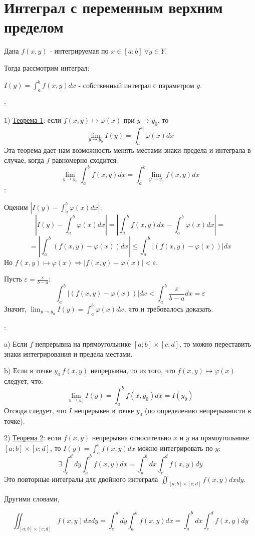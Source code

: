 \documentclass[12pt]{article}
\begin{document}
\section{Интеграл с переменным верхним пределом}
Дана $f(x,y)$ - интегрируемая по $x \in [a;b] \ \forall y \in Y$.\par
Тогда рассмотрим интеграл:\par
$I(y) = \int_a^b f(x,y) dx$ - собственный интеграл с параметром $y$.\par
{}:\par
1) \uline{Теорема 1}: если $f(x,y) \mapsto \varphi(x)$ при $y \to y_0$, то
$$\lim_{y \to y_0} I(y) = \int_a^b \varphi (x) dx$$
Эта теорема дает нам возможность менять местами знаки предела и интеграла в случае, когда $f$ равномерно сходится:
$$\lim_{y \to y_0} \int_a^b f(x,y) dx = \int_a^b \lim_{y \to y_0} f(x,y) dx$$
:\par
Оценим $|I(y)-\int_a^b \varphi(x)dx|$:
$$|I(y)-\int_a^b \varphi(x)dx| = |\int_a^b f(x,y)dx-\int_a^b \varphi(x)dx| =$$
$$= |\int_a^b (f(x,y)-\varphi(x))dx| \leq \int_a^b |(f(x,y)-\varphi(x))|dx$$
Но $f(x,y) \mapsto \varphi(x) \Rightarrow |f(x,y) - \varphi(x)| < \varepsilon$.\par
Пусть $\varepsilon = \frac{\varepsilon}{b-a}$:
$$\int_a^b |(f(x,y)-\varphi(x))|dx < \int_a^b \frac{\varepsilon}{b-a} dx = \varepsilon$$
Значит, $\lim_{y \to y_0} I(y) = \int_a^b \varphi (x) dx$, что и требовалось доказать.\par
{}:\par
a) Если $f$ непрерывна на прямоугольнике $[a;b] \times [c;d]$, то можно переставить знаки интегрирования и предела местами.\par
b) Если в точке $y_0 \  f(x,y)$ непрерывна, то из того, что $f(x,y) \mapsto \varphi(x)$ следует, что:
$$\lim_{y \to y_0} I(y) = \int_a^b f(x,y_0) dx = I(y_0)$$
Отсюда следует, что $I$ непрерывен в точке $y_0$ (по определению непрерывности в точке).\par
2) \uline{Теорема 2}: если $f(x,y)$ непрерывна относительно $x$ и $y$ на прямоугольнике $[a;b] \times [c;d]$, то $I(y) = \int_a^b f(x,y) dx$ можно интегрировать по $y$:
$$\exists \int_c^d dy \int_a^b f(x,y) dx = \int_a^b dx \int_c^d f(x,y) dy$$
Это повторные интегралы для двойного интеграла $\iint_{[a;b]\times [c;d]} f(x,y) dxdy$.\par
Другими словами,\par $$\iint_{[a;b]\times [c;d]} f(x,y) dxdy = \int_c^d dy \int_a^b f(x,y) dx = \int_a^b dx \int_c^d f(x,y) dy$$
\end{document}
